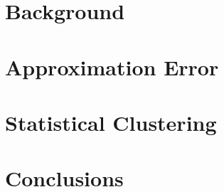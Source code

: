 \documentclass[12pt,twoside]{mitthesis}
\begin{document}
\part{Background}




\part{Approximation Error}




\part{Statistical Clustering}






\part{Conclusions}


\appendix


\begin{singlespace}


\end{singlespace}
\end{document}
